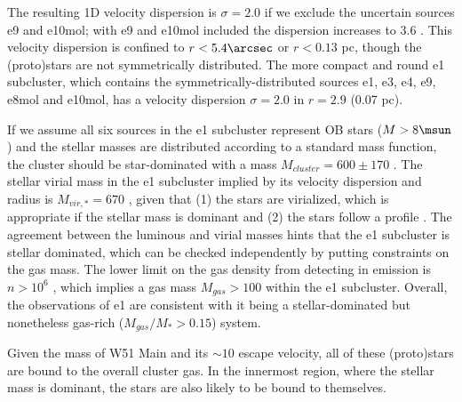 The resulting 1D velocity dispersion is $\sigma=2.0$ \kms if we exclude the
uncertain sources e9 and e10mol; with e9 and e10mol included the dispersion
increases to 3.6 \kms.  This velocity dispersion is confined to $r<5.4\arcsec$
or $r<0.13$ pc, though the (proto)stars are not symmetrically distributed. 
The more compact and round e1 subcluster, which contains the
symmetrically-distributed sources e1, e3, e4, e9, e8mol and e10mol, has a
velocity dispersion $\sigma=2.0$ \kms in $r=2.9$ \arcsec (0.07 pc).

If we assume all six sources in the e1 subcluster represent OB stars
($M>8\msun$) and the stellar masses are distributed according to a standard
\citet{Kroupa2001a} mass function, the cluster should be star-dominated with a
mass $M_{cluster}=600\pm170$ \msun.  
The stellar virial mass in the e1 subcluster implied by its velocity dispersion 
and radius is $M_{vir,*}=670$ \msun, given that (1)
the stars are virialized, which
is appropriate if the stellar mass is dominant \citep{Kruijssen2012b}
and (2)
the stars follow a \citet{Plummer1911a}
profile \citep[cf.][though the inferred mass is insensitive to the
assumed radial profile]{Portegies-Zwart2010a}. 
The agreement between the luminous and virial masses hints that the e1
subcluster is stellar dominated, which can be checked independently by putting
constraints on the gas mass.  The
lower limit on the gas density from detecting \formaldehyde in emission is
$n>10^6$ \percc, which implies a gas mass $M_{gas} > 100$ \msun within the e1
subcluster.  Overall, the observations of e1 are consistent with it being a
stellar-dominated but nonetheless gas-rich ($M_{gas}/M_{*} > 0.15$) system.


Given the mass of W51 Main and its $\sim10$ \kms escape velocity, all of these
(proto)stars are bound to the overall cluster gas.  In the innermost region,
where the stellar mass is dominant, the stars are also likely to be bound to
themselves.

